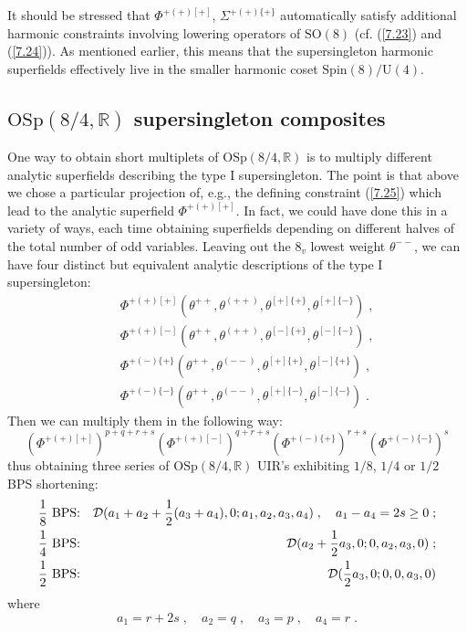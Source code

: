 \documentclass[a4paper,12pt]{article}
\begin{document}
It should be stressed that $\Phi^{+(+)[+]}$, $\Sigma^{+(+)\{+\}}$ 
automatically satisfy additional harmonic constraints involving 
lowering operators of $\mbox{SO}(8)$ (cf. (\ref{7.23}) and 
(\ref{7.24})). As mentioned earlier, this means that the 
supersingleton harmonic superfields effectively live in the 
smaller harmonic coset $\mbox{Spin}(8)/\mbox{U}(4)$. 

\subsection{$\mbox{OSp}(8/4,\mathbb{R})$ supersingleton composites}

One way to obtain short multiplets of $\mbox{OSp}(8/4,\mathbb{R})$ 
is to multiply different analytic superfields describing the type 
I supersingleton. The point is that above we chose a particular 
projection of, e.g., the defining constraint (\ref{7.25}) which 
lead to the analytic superfield  $\Phi^{+(+)[+]}$. In fact, we 
could have done this in a variety of ways, each time obtaining 
superfields depending on different halves of the total number of 
odd variables. Leaving out the $8_v$ lowest weight $\theta^{--}$, 
we can have four distinct but equivalent analytic descriptions of 
the type I supersingleton: 
\begin{eqnarray}
  &&\Phi^{+(+)[+]}
(\theta^{++}, \theta^{(++)}, \theta^{[+]\{+\}}, 
\theta^{[+]\{-\}})\;, \nonumber\\ 
  &&\Phi^{+(+)[-]} (\theta^{++}, \theta^{(++)}, 
\theta^{[-]\{+\}}, \theta^{[-]\{-\}})\;, \nonumber\\ 
  &&\Phi^{+(-)\{+\}} (\theta^{++}, 
\theta^{(--)}, \theta^{[+]\{+\}}, \theta^{[-]\{+\}})\;, 
\nonumber\\ 
  &&\Phi^{+(-)\{-\}} 
(\theta^{++}, \theta^{(--)}, \theta^{[+]\{-\}}, 
\theta^{[-]\{-\}})\;. \label{7.34} 
\end{eqnarray}
Then we can multiply them in the following way: 
\begin{equation}\label{7.35}
  (\Phi^{+(+)[+]})^{p+q+r+s}(\Phi^{+(+)[-]})^{q+r+s} 
(\Phi^{+(-)\{+\}})^{r+s}(\Phi^{+(-)\{-\}})^{s} 
\end{equation}
thus obtaining three series of $\mbox{OSp}(8/4,\mathbb{R})$ UIR's 
exhibiting $1/8$, $1/4$ or $1/2$ BPS shortening: 
\begin{eqnarray}
 {1\over 8}  \mbox{ BPS:} && {\cal D}(a_1+a_2 + {1\over 
2}(a_3+a_4), 0; a_1,a_2,a_3,a_4)\;, \quad a_1-a_4 = 2s \geq 0\;;    
 \nonumber\\
 {1\over 4}  \mbox{ BPS:} && {\cal D}(a_2 + {1\over 2}a_3, 0; 
0,a_2,a_3,0)\;;  \label{7.36}\\ 
 {1\over 2}  \mbox{ BPS:} && {\cal D}({1\over 2}a_3, 0; 0,0,a_3,0)  
\nonumber \end{eqnarray} 
where
\begin{equation}\label{7.37'}
a_1=r+2s\;, \quad a_2= q\;, \quad a_3=p\;, \quad a_4=r\;.
\end{equation}
\end{document}
